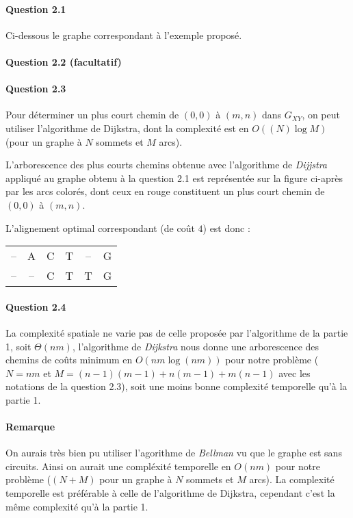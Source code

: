 \paragraph{Question 2.1}
Ci-dessous le graphe correspondant \`a l'exemple propos\'e.


\paragraph{Question 2.2 (facultatif)}

\newpage
\paragraph{Question 2.3}
Pour d\'eterminer un plus court chemin de $(0,0)$ \`a $(m,n)$ dans
$G_{XY}$, on peut utiliser l'algorithme de Dijkstra, dont la
complexit\'e est en $O((N)\log M)$ (pour un graphe \`a $N$ sommets
et $M$ arcs).

L'arborescence des plus courts chemins obtenue avec l'algorithme de
\emph{Dijjstra} appliqu\'e au graphe obtenu \`a la question 2.1 est
repr\'esent\'ee sur la figure ci-apr\`es par les arcs color\'es, dont
ceux en rouge constituent un plus court chemin de $(0,0)$ \`a $(m,n)$.


L'alignement optimal correspondant (de co\^ut $4$) est donc :
\begin{table*}[h]
  \centering
  \begin{tabular}{c|ccccc}
    \hline
    --&A&C&T&--&G\\
    --&--&C&T&T&G\\
    \hline
  \end{tabular}
\end{table*}

\paragraph{Question 2.4}
La complexit\'e spatiale ne varie pas de celle propos\'ee par
l'algorithme de la partie 1, soit $\Theta(nm)$, l'algorithme de
\emph{Dijkstra} nous donne une arborescence des chemins de co\^uts
minimum en $O(nm\log(nm))$ pour notre probl\`eme ($N=nm$ et
$M=(n-1)(m-1)+n(m-1)+m(n-1)$ avec les notations de la question 2.3),
soit une moins bonne complexit\'e temporelle qu'\`a la partie 1.

\paragraph{Remarque}
On aurais tr\`es bien pu utiliser l'agorithme de \emph{Bellman} vu que
le graphe est sans circuits. Ainsi on aurait une compl\'exit\'e
temporelle en $O(nm)$ pour notre probl\`eme \linebreak ($(N+M)$ pour un graphe
\`a $N$ sommets et $M$ arcs). La complexit\'e temporelle est
pr\'ef\'erable \`a celle de l'algorithme de Dijkstra, cependant c'est
la m\^eme complexit\'e qu'\`a la partie 1.
